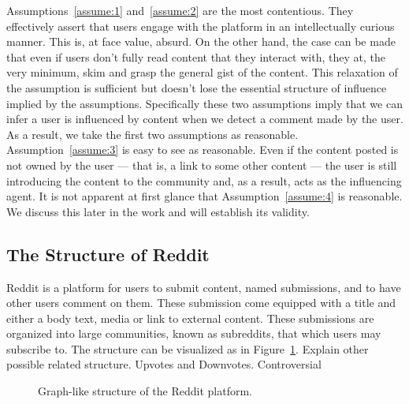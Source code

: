 \documentclass[letterpaper, 10 pt, conference]{ieeeconf}
\theoremstyle{definition}
\newcommand{\red}{\color{red}}
\begin{document}
Assumptions~\ref{assume:1} and~\ref{assume:2} are the most contentious. They effectively assert that users engage with the platform in an intellectually curious manner. This is, at face value, absurd. On the other hand, the case can be made that even if users don't fully read content that they interact with, they at, the very minimum, skim and grasp the general gist of the content. This relaxation of the assumption is sufficient but doesn't lose the essential structure of influence implied by the assumptions. Specifically these two assumptions imply that we can infer a user is influenced by content when we detect a comment made by the user. As a result, we take the first two assumptions as reasonable. Assumption~\ref{assume:3} is easy to see as reasonable. Even if the content posted is not owned by the user --- that is, a link to some other content --- the user is still introducing the content to the community and, as a result, acts as the influencing agent. It is not apparent at first glance that Assumption~\ref{assume:4} is reasonable. We discuss this later in the work and will establish its validity.

\subsection{The Structure of Reddit}
Reddit is a platform for users to submit content, named submissions, and to have other users comment on them. These submission come equipped with a title and either a body text, media or link to external content. These submissions are organized into large communities, known as subreddits, that which users may subscribe to. The structure can be visualized as in Figure~\ref{fig:model:reddit}.
{\red Explain other possible related structure. Upvotes and Downvotes. Controversial}

\begin{figure}
  \centering
  \caption{Graph-like structure of the Reddit platform.}
  \label{fig:model:reddit}
\end{figure}
\end{document}
